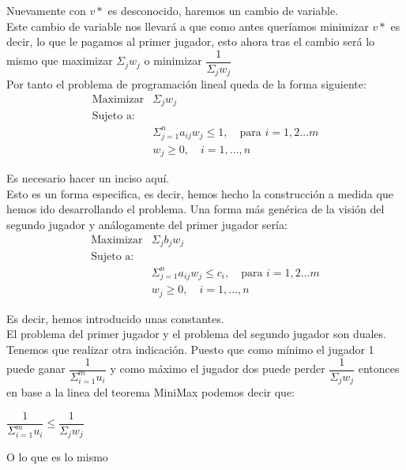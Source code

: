 \documentclass[10pt,a4paper]{book}
\begin{document}
Nuevamente con $v*$ es desconocido, haremos un cambio de variable.\\ 
Este cambio de variable nos llevará a que como antes queríamos minimizar $v*$ es decir, lo que le pagamos al primer jugador, esto ahora tras el cambio será lo mismo que maximizar $\Sigma_j w_j$ o minimizar $\dfrac{1}{\Sigma_j w_j}$\\

Por tanto el problema de programación lineal queda de la forma siguiente:\\

$$\begin{array}{lc}
\mbox{Maximizar} & \Sigma_j w_j\\
\mbox{Sujeto a:}  \\
&  \Sigma^n_{j=1} a_{ij}w_j \leq 1, \quad \mbox{para } i=1,2 \ldots m\\
&w_j \geq 0, \quad i=1, \ldots ,n
\end{array}$$

Es necesario hacer un inciso aquí. \\

Esto es un forma especifica, es decir, hemos hecho la construcción a medida que hemos ido desarrollando el problema. Una forma más genérica de la visión del segundo jugador y análogamente del primer jugador sería:\\

$$\begin{array}{lc}
\mbox{Maximizar} & \Sigma_j b_jw_j\\
\mbox{Sujeto a:}  \\
&  \Sigma^n_{j=1} a_{ij}w_j \leq c_i, \quad \mbox{para } i=1,2 \ldots m\\
&w_j \geq 0, \quad i=1, \ldots ,n
\end{array}$$

Es decir, hemos introducido unas constantes.\\

El problema del primer jugador y el problema del segundo jugador son duales.\\

Tenemos que realizar otra indicación. Puesto que como mínimo el jugador 1 puede ganar $\dfrac{1}{\Sigma^m_{i=1}u_i}$ y como máximo el jugador dos puede perder $\dfrac{1}{\Sigma_j w_j}$ entonces en base a la linea del teorema MiniMax podemos decir que:\\

\begin{center}

$\dfrac{1}{\Sigma^m_{i=1}u_i} \leq \dfrac{1}{\Sigma_j w_j}$

\end{center} 
O lo que es lo mismo
\end{document}
